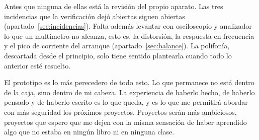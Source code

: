 Antes que ninguna de ellas está la revisión del propio aparato. Las tres
incidencias que la verificación dejó abiertas siguen abiertas
(apartado~\ref{sec:incidencias}). Falta además levantar con
osciloscopio y analizador lo que un multímetro no alcanza, esto es, la
distorsión, la respuesta en frecuencia y el pico de corriente del arranque
(apartado~\ref{sec:balance}). La polifonía, descartada desde el principio, solo
tiene sentido plantearla cuando todo lo anterior esté resuelto.

El prototipo es lo más perecedero de todo esto. Lo que permanece no está dentro
de la caja, sino dentro de mi cabeza. La experiencia de haberlo hecho, de haberlo 
pensado y de haberlo escrito es lo que queda, y es lo que me permitirá abordar con
más seguridad los próximos proyectos. Proyectos serán más ambiciosos, proyectos que espero que me dejen
con la misma sensación de haber aprendido algo que no estaba en ningún libro ni en ninguna clase. 

